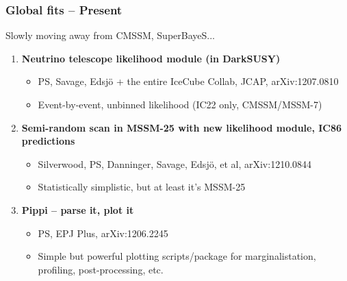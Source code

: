 \documentclass[xcolor=dvipsnames]{beamer}
\begin{document}
\begin{frame}
\frametitle{Global fits -- Present}


Slowly moving away from CMSSM, SuperBayeS...\vspace{5mm}

\begin{enumerate}
\item{\bf Neutrino telescope likelihood module (in DarkSUSY)}
\begin{itemize}
\item{PS, Savage, Edsj\"o + the entire IceCube Collab, JCAP, arXiv:1207.0810}
\item{Event-by-event, unbinned likelihood (IC22 only, CMSSM/MSSM-7)}
\end{itemize}

\item{\bf Semi-random scan in MSSM-25 with new likelihood module, IC86 predictions}
\begin{itemize}
\item{Silverwood, PS, Danninger, Savage, Edsj\"o, et al, arXiv:1210.0844}
\item{Statistically simplistic, but at least it's MSSM-25}
\end{itemize}

\item{\bf Pippi -- parse it, plot it}
\begin{itemize}
\item{PS, EPJ Plus, arXiv:1206.2245}
\item{Simple but powerful plotting scripts/package for marginalistation, profiling, post-processing, etc.}
\end{itemize}

\end{enumerate}

\end{frame}
\end{document}
